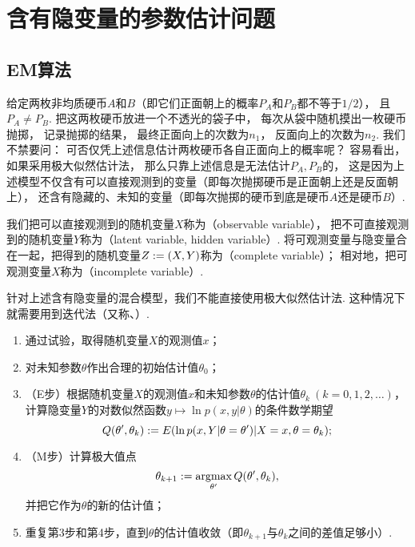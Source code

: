 \section{含有隐变量的参数估计问题}
\subsection{EM算法}
给定两枚非均质硬币\(A\)和\(B\)（即它们正面朝上的概率\(P_A\)和\(P_B\)都不等于\(1/2\)），
且\(P_A \neq P_B\).
把这两枚硬币放进一个不透光的袋子中，
每次从袋中随机摸出一枚硬币抛掷，
记录抛掷的结果，
最终正面向上的次数为\(n_1\)，
反面向上的次数为\(n_2\).
我们不禁要问：
可否仅凭上述信息估计两枚硬币各自正面向上的概率呢？
容易看出，
如果采用极大似然估计法，
那么只靠上述信息是无法估计\(P_A,P_B\)的，
这是因为上述模型不仅含有可以直接观测到的变量（即每次抛掷硬币是正面朝上还是反面朝上），
还含有隐藏的、未知的变量（即每次抛掷的硬币到底是硬币\(A\)还是硬币\(B\)）.

我们把可以直接观测到的随机变量\(X\)称为（observable variable），
把不可直接观测到的随机变量\(Y\)称为（latent variable, hidden variable）.
将可观测变量与隐变量合在一起，把得到的随机变量\(Z := (X,Y)\)称为（complete variable）；
相对地，把可观测变量\(X\)称为（incomplete variable）.

针对上述含有隐变量的混合模型，我们不能直接使用极大似然估计法.
这种情况下就需要用到迭代法（又称、）.
\begin{algorithm}[极大期望估计法]
\hfill
\begin{enumerate}
	\item 通过试验，取得随机变量\(X\)的观测值\(x\)；
	\item 对未知参数\(\theta\)作出合理的初始估计值\(\theta_0\)；
	\item （E步）根据随机变量\(X\)的观测值\(x\)和未知参数\(\theta\)的估计值\(\theta_k\ (k=0,1,2,\dotsc)\)，
	计算隐变量\(Y\)的对数似然函数\(y \mapsto \ln p(x,y \vert \theta)\)的条件数学期望\begin{equation*}
		Q(\theta',\theta_k)
		:=
		E(\ln p(x,Y \vert \theta=\theta') \vert X=x, \theta=\theta_k);
	\end{equation*}
	\item （M步）计算极大值点\begin{equation*}
		\theta_{k+1}
		:= \operatorname*{argmax}_{\theta'} Q(\theta',\theta_k),
	\end{equation*}
	并把它作为\(\theta\)的新的估计值；
	\item 重复第3步和第4步，直到\(\theta\)的估计值收敛（即\(\theta_{k+1}\)与\(\theta_k\)之间的差值足够小）.
\end{enumerate}
\end{algorithm}

